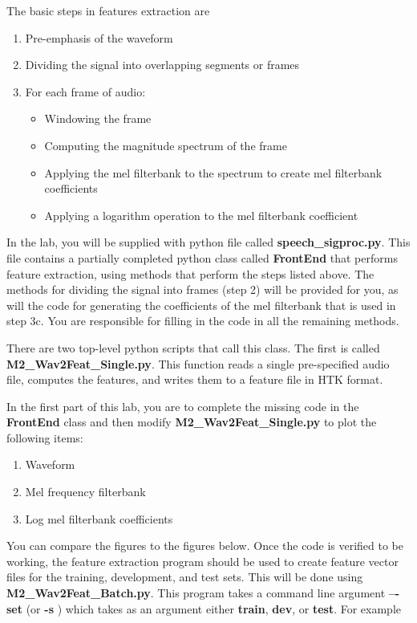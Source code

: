 The basic steps in features extraction are
\begin{enumerate}
	\item Pre-emphasis of the waveform
	\item Dividing the signal into overlapping segments or frames
	\item For each frame of audio:
		\begin{itemize}
			\item Windowing the frame
			\item Computing the magnitude spectrum of the frame
			\item Applying the mel filterbank to the spectrum to create mel filterbank coefficients
			\item Applying a logarithm operation to the mel filterbank coefficient
		\end{itemize}
\end{enumerate}
In the lab, you will be supplied with python file called {\bf speech\_sigproc.py}. This file contains a partially completed python class called {\bf FrontEnd} that performs feature extraction, using methods that perform the steps listed above. The methods for dividing the signal into frames (step 2) will be provided for you, as will the code for generating the coefficients of the mel filterbank that is used in step 3c. You are responsible for filling in the code in all the remaining methods.

There are two top-level python scripts that call this class. The first is called {\bf M2\_Wav2Feat\_Single.py}. This function reads a single pre-specified audio file, computes the features, and writes them to a feature file in HTK format.

In the first part of this lab, you are to complete the missing code in the {\bf FrontEnd} class and then modify {\bf M2\_Wav2Feat\_Single.py} to plot the following items:
\begin{enumerate}
	\item Waveform
	\item Mel frequency filterbank
	\item Log mel filterbank coefficients
\end{enumerate}

You can compare the figures to the figures below. Once the code is verified to be working, the feature extraction program should be used to create feature vector files for the training, development, and test sets. This will be done using {\bf M2\_Wav2Feat\_Batch.py}. This program takes a command line argument {\bf –-set} (or {\bf -s} ) which takes as an argument either {\bf train}, {\bf dev}, or {\bf test}. For example

